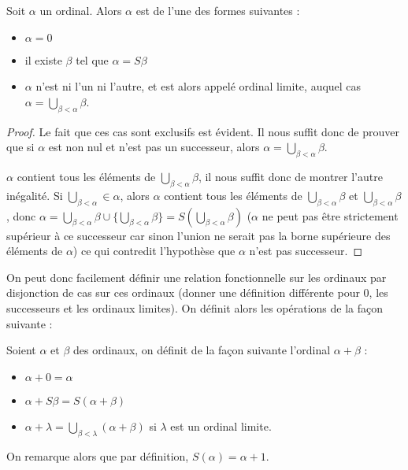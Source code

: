 \begin{lem}
    Soit $\alpha$ un ordinal. Alors $\alpha$ est de l'une des formes suivantes :
    \begin{itemize}[label=$\bullet$]
        \item $\alpha = 0$
        \item il existe $\beta$ tel que $\alpha = S \beta$
        \item $\alpha$ n'est ni l'un ni l'autre, et est alors appelé ordinal limite, auquel cas $\displaystyle{\alpha = \bigcup_{\beta < \alpha} \beta}$.
    \end{itemize}
\end{lem}

\begin{proof}
    Le fait que ces cas sont exclusifs est évident. Il nous suffit donc de prouver que si $\alpha$ est non nul et n'est pas un successeur, alors $\alpha = \bigcup_{\beta <\alpha} \beta$.

    $\alpha$ contient tous les éléments de $\bigcup_{\beta < \alpha} \beta$, il nous suffit donc de montrer l'autre inégalité. Si $\bigcup_{\beta < \alpha} \in \alpha$, alors $\alpha$ contient tous les éléments de $\bigcup_{\beta < \alpha}\beta$ et $\bigcup_{\beta < \alpha}\beta$, donc $\alpha = \bigcup_{\beta < \alpha} \beta \cup \{\bigcup_{\beta < \alpha}\beta\} = S(\bigcup_{\beta < \alpha}\beta)$ ($\alpha$ ne peut pas être strictement supérieur à ce successeur car sinon l'union ne serait pas la borne supérieure des éléments de $\alpha$) ce qui contredit l'hypothèse que $\alpha$ n'est pas successeur.
\end{proof}

On peut donc facilement définir une relation fonctionnelle sur les ordinaux par disjonction de cas sur ces ordinaux (donner une définition différente pour $0$, les successeurs et les ordinaux limites). On définit alors les opérations de la façon suivante :

\begin{defi}
    Soient $\alpha$ et $\beta$ des ordinaux, on définit de la façon suivante l'ordinal $\alpha + \beta$ :
    \begin{itemize}[label=$\bullet$]
        \item $\alpha + 0 = \alpha$
        \item $\alpha + S \beta = S (\alpha + \beta)$
        \item $\displaystyle{\alpha + \lambda = \bigcup_{\beta < \lambda} (\alpha + \beta)}$ si $\lambda$ est un ordinal limite.
    \end{itemize}

    On remarque alors que par définition, $S(\alpha) = \alpha + 1$.
\end{defi}

